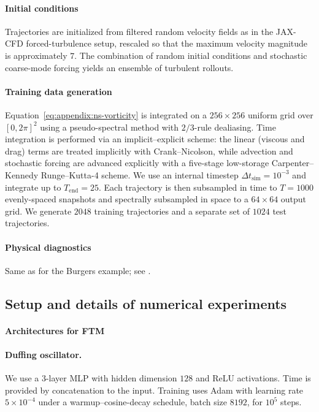 \documentclass[oneside,11pt]{article}
\theoremstyle{remark}
\begin{document}
\paragraph{Initial conditions}
Trajectories are initialized from filtered random velocity fields as in the
JAX-CFD forced-turbulence setup, rescaled so that the maximum velocity
magnitude is approximately $7$.  The combination of random initial
conditions and stochastic coarse-mode forcing yields an ensemble of turbulent rollouts.

\paragraph{Training data generation}
Equation~\eqref{eq:appendix:ns-vorticity} is integrated on a $256 \times 256$ uniform grid over $[0, 2\pi]^2$ using a pseudo-spectral method with $2/3$-rule dealiasing. Time integration is performed via an implicit--explicit scheme: the linear (viscous and drag) terms are treated implicitly with Crank--Nicolson, while advection and stochastic forcing are advanced explicitly with a five-stage low-storage Carpenter--Kennedy Runge--Kutta-4 scheme. We use an internal timestep $\Delta t_{\mathrm{sim}} = 10^{-3}$ and integrate up to $T_{\mathrm{end}} = 25$. Each trajectory is then subsampled in time to $T = 1000$ evenly-spaced snapshots and spectrally subsampled in space to a $64 \times 64$ output grid. We generate $2048$ training trajectories and a separate set of $1024$ test trajectories.

\paragraph{Physical diagnostics} Same as for the Burgers example; see . 

\subsection{Setup and details of numerical experiments}

\paragraph{Architectures for FTM}

\paragraph{Duffing oscillator.}
We use a 3-layer MLP with hidden dimension $128$ and ReLU activations. Time is provided by concatenation to the input. Training uses Adam with learning rate $5\times10^{-4}$ under a warmup--cosine-decay schedule, batch size $8192$, for $10^5$ steps.
\end{document}
